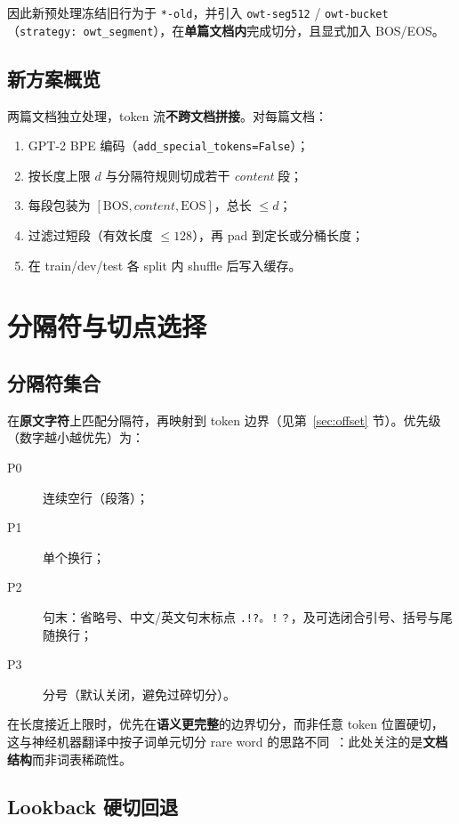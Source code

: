 \documentclass[UTF8,a4paper,11pt]{ctexart}
\begin{document}
因此新预处理冻结旧行为于 \texttt{*-old}，并引入 \texttt{owt-seg512} / \texttt{owt-bucket}（\texttt{strategy: owt\_segment}），在\textbf{单篇文档内}完成切分，且显式加入 BOS/EOS。

\subsection{新方案概览}

两篇文档独立处理，token 流\textbf{不跨文档拼接}。对每篇文档：
\begin{enumerate}
  \item GPT-2 BPE 编码（\texttt{add\_special\_tokens=False}）；
  \item 按长度上限 $d$ 与分隔符规则切成若干 \emph{content} 段；
  \item 每段包装为 $[\mathrm{BOS}, content, \mathrm{EOS}]$，总长 $\le d$；
  \item 过滤过短段（有效长度 $\le 128$），再 pad 到定长或分桶长度；
  \item 在 train/dev/test 各 split 内 shuffle 后写入缓存。
\end{enumerate}

\section{分隔符与切点选择}

\subsection{分隔符集合}

在\textbf{原文字符}上匹配分隔符，再映射到 token 边界（见第~\ref{sec:offset} 节）。优先级（数字越小越优先）为：
\begin{description}
  \item[P0] 连续空行（段落）；
  \item[P1] 单个换行；
  \item[P2] 句末：省略号、中文/英文句末标点 \texttt{.!?。！？}，及可选闭合引号、括号与尾随换行；
  \item[P3] 分号（默认关闭，避免过碎切分）。
\end{description}

在长度接近上限时，优先在\textbf{语义更完整}的边界切分，而非任意 token 位置硬切，这与神经机器翻译中按子词单元切分 rare word 的思路不同~\cite{sennrich2016neural}：此处关注的是\textbf{文档结构}而非词表稀疏性。

\subsection{Lookback 硬切回退}
\end{document}
